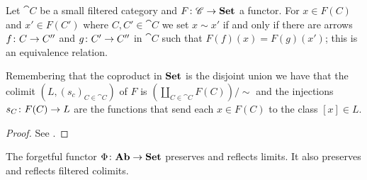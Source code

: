 \begin{proposition}
  \label{prop:strange_relation}
  Let \(\cat{C}\) be a small filtered category and \(F\colon {\mathscr C}\to \text{\normalfont\textbf{Set}}\) a functor. For \(x\in F(C)\) and \(x'\in F(C')\) where \(C,C'\in\cat{C}\) we set \(x\sim x'\) if and only if there are arrows \(f\colon C\to C''\) and \(g\colon C'\to C''\) in \(\cat{C}\) such that \(F(f)(x) = F(g)(x')\); this is an equivalence relation.

  Remembering that the coproduct in \(\text{\normalfont\textbf{Set}}\) is the disjoint union we have that the colimit \((L, (s_c)_{C\in\cat{C}})\) of \(F\) is \(\left(\coprod_{C\in\cat{C}}F(C)\right)/\sim\) and the injections \(s_C\colon F(C)\to L\) are the functions that send each \(x\in F(C)\) to the class \([x]\in L\).
\end{proposition}

\begin{proof}
  See \cite[Proposition 2.13.3]{handbook1}.
\end{proof}
  
\begin{proposition}
  \label{prop:ab_forgetful}
  The forgetful functor \(\Phi\colon \text{\normalfont\textbf{Ab}}\to \text{\normalfont\textbf{Set}}\) preserves and reflects limits. It also preserves and reflects filtered colimits.
\end{proposition}

